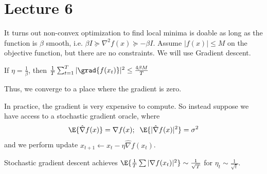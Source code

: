 \section{Lecture 6}
It turns out non-convex optimization to find local minima is doable
as long as the function is $\beta$ smooth, i.e. $\beta I \succeq \nabla^2 f(x) \succeq - \beta I$.
Assume $|f(x)| \le M$
on the objective function, but there are no constraints. We will use Gradient descent.
\begin{theorem}
    If $ \eta = \frac{1}{\beta}$, then $\frac{1}{T} \sum_{t = 1}^{T} | \grad{f(x_t)} |^2 \le \frac{4\beta M}{T}$
\end{theorem}
Thus, we converge to a place where the gradient is zero.

In practice, the gradient is very expensive to compute. So instead suppose
we have access to a stochastic gradient oracle,
where
\[ \E{\hat{\nabla} f(x)} = \nabla f(x) ; \; \; \E{|\hat{\nabla}f(x)|^2} = \sigma^2 \]
and we perform update $x_{t + 1} \gets x_t - \eta \hat{\nabla}f(x_t)$.
\begin{theorem}
    Stochastic gradient descent achieves $\E{\frac{1}{T} \sum |\nabla f(x_t)|^2} \sim \frac{1}{\sqrt{T}}$
    for $\eta_t \sim \frac{1}{\sqrt{t}}$.
\end{theorem}

